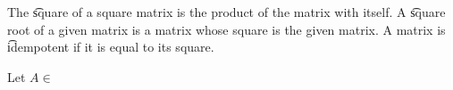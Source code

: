 



The \t{square} of a square matrix is the product of the matrix with itself.
A \t{square root} of a given matrix is a matrix whose square is the given matrix.
A matrix is \t{idempotent} if it is equal to its square.


Let $A \in$
